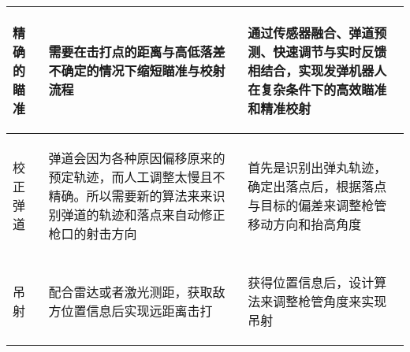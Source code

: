 \begin{longtable}{ p{2cm} | p{7.8cm} | p{6cm} |}
        \begin{center}
            精确的瞄准
        \end{center} &
        \begin{center}
            需要在击打点的距离与高低落差不确定的情况下缩短瞄准与校射流程
        \end{center} &
        \begin{center}
            通过传感器融合、弹道预测、快速调节与实时反馈相结合，实现发弹机器人在复杂条件下的高效瞄准和精准校射
        \end{center} \\
        
    \hline
    
        \begin{center}
            校正弹道
        \end{center} &
        \begin{center}
            弹道会因为各种原因偏移原来的预定轨迹，而人工调整太慢且不精确。所以需要新的算法来来识别弹道的轨迹和落点来自动修正枪口的射击方向
        \end{center} &
        \begin{center}
            首先是识别出弹丸轨迹，确定出落点后，根据落点与目标的偏差来调整枪管移动方向和抬高角度
        \end{center} \\
        
    \hline
    
        \begin{center}
            吊射
        \end{center} &
        \begin{center}
            配合雷达或者激光测距，获取敌方位置信息后实现远距离击打
        \end{center} &
        \begin{center}
            获得位置信息后，设计算法来调整枪管角度来实现吊射
        \end{center} \\
        
    \hline
    

\end{longtable}
